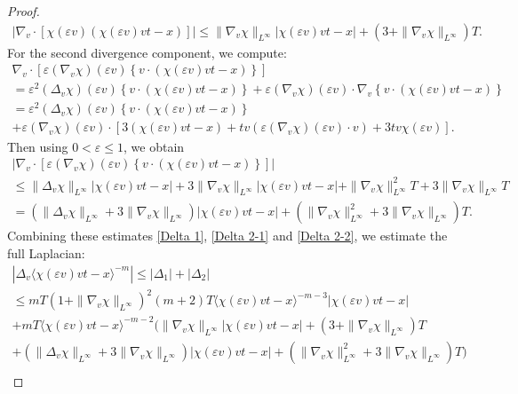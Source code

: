 \documentclass[reqno,11pt,final]{amsart}
\theoremstyle{plain}
\numberwithin{equation}{section}
\numberwithin{theorem}{section}
\begin{document}
\begin{proof}
\begin{align}
|\nabla_v\cdot[\chi(\varepsilon v)(\chi(\varepsilon v)vt - x)]| \le \|\nabla_v\chi\|_{L^\infty}|\chi(\varepsilon v)vt - x| + (3+\|\nabla_v\chi\|_{L^\infty})T.
\end{align}For the second divergence component, we compute:
\begin{multline*}
\nabla_v\cdot \left[\varepsilon (\nabla_v\chi)(\varepsilon v)\left\{v\cdot(\chi(\varepsilon v)vt - x)\right\}\right]\\
=\varepsilon^2(\Delta_v\chi)(\varepsilon v)\left\{v\cdot(\chi(\varepsilon v)vt - x)\right\} + \varepsilon (\nabla_v\chi)(\varepsilon v)\cdot\nabla_v\left\{v\cdot(\chi(\varepsilon v)vt - x) \right\}\\
=\varepsilon^2(\Delta_v\chi)(\varepsilon v)\left\{v\cdot(\chi(\varepsilon v)vt - x)\right\} 
\\
+ \varepsilon(\nabla_v\chi)(\varepsilon v)\cdot\left[3(\chi(\varepsilon v)vt - x) + tv(\varepsilon(\nabla_v\chi)(\varepsilon v)\cdot v) + 3tv\chi(\varepsilon v)\right].
\end{multline*}Then using $0<\varepsilon\le 1$, we obtain
\begin{multline}
    |\nabla_v\cdot \left[\varepsilon (\nabla_v\chi)(\varepsilon v)\left\{v\cdot(\chi(\varepsilon v)vt - x)\right\}\right]| \\
    \le\|\Delta_v\chi\|_{L^\infty}|\chi(\varepsilon v)vt - x| + 3\|\nabla_v\chi\|_{L^\infty}|\chi(\varepsilon v) vt - x| + \|\nabla_v\chi\|_{L^\infty}^2T + 3\|\nabla_v\chi\|_{L^\infty}T\\
= (\|\Delta_v\chi\|_{L^\infty}+ 3\|\nabla_v\chi\|_{L^\infty})|\chi(\varepsilon v) vt-x| + (\|\nabla_v\chi\|_{L^\infty}^2 + 3\|\nabla_v\chi\|_{L^\infty})T.\label{Delta 2-2}
\end{multline}Combining these estimates \eqref{Delta 1}, \eqref{Delta 2-1} and \eqref{Delta 2-2}, we estimate the full Laplacian:
\begin{multline}
|\Delta_v\langle \chi(\varepsilon v) vt - x\rangle^{-m}|\le |\Delta_1| + |\Delta_2| \\
\le mT  (1+\|\nabla_v\chi\|_{L^\infty})^2(m+2)T\langle \chi(\varepsilon v)vt - x\rangle^{-m-3} |\chi(\varepsilon v)vt - x|\\
+ mT \langle \chi(\varepsilon v)vt - x\rangle^{-m-2} (\|\nabla_v\chi\|_{L^\infty}|\chi(\varepsilon v)vt - x| + (3+\|\nabla_v\chi\|_{L^\infty})T \\+ (\|\Delta_v\chi\|_{L^\infty}+ 3\|\nabla_v\chi\|_{L^\infty})|\chi(\varepsilon v)vt - x| + (\|\nabla_v\chi\|_{L^\infty}^2 + 3\|\nabla_v\chi\|_{L^\infty})T)\\

\end{multline}
\end{proof}
\end{document}
